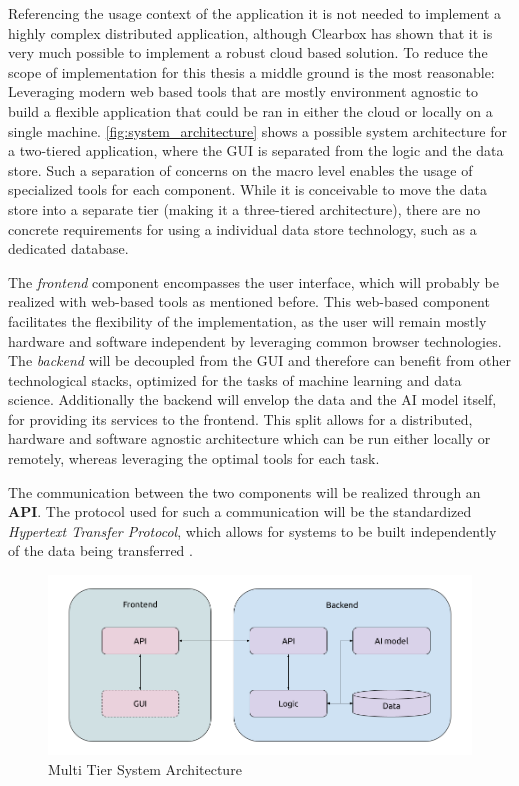 \documentclass[11pt,a4paper,english]{scrreprt}
\begin{document}
Referencing the usage context of the application it is not needed to implement a highly complex distributed application, although Clearbox has shown that it is very much possible to implement a robust cloud based solution. To reduce the scope of implementation for this thesis a middle ground is the most reasonable: Leveraging modern web based tools that are mostly environment agnostic to build a flexible application that could be ran in either the cloud or locally on a single machine. \autoref{fig:system_architecture} shows a possible system architecture for a two-tiered application, where the GUI is separated from the logic and the data store. Such a separation of concerns on the macro level enables the usage of specialized tools for each component. While it is conceivable to move the data store into a separate tier (making it a three-tiered architecture), there are no concrete requirements for using a individual data store technology, such as a dedicated database.

The \textit{frontend} component encompasses the user interface, which will probably be realized with web-based tools as mentioned before. This web-based component facilitates the flexibility of the implementation, as the user will remain mostly hardware and software independent by leveraging common browser technologies. The \textit{backend} will be decoupled from the GUI and therefore can benefit from other technological stacks, optimized for the tasks of machine learning and data science. Additionally the backend will envelop the data and the AI model itself, for providing its services to the frontend. This split allows for a distributed, hardware and software agnostic architecture which can be run either locally or remotely, whereas leveraging the optimal tools for each task.

The communication between the two components will be realized through an \textbf{API}. The protocol used for such a communication will be the standardized \textit{Hypertext Transfer Protocol}, which allows for systems
to be built independently of the data being transferred \parencite{rfc2616}.

\begin{figure}[htbp]
    \centering
    \includegraphics[width=\textwidth]{img/figures/architecture.png}
    \caption{Multi Tier System Architecture}
    \label{fig:system_architecture}
\end{figure}
\end{document}
